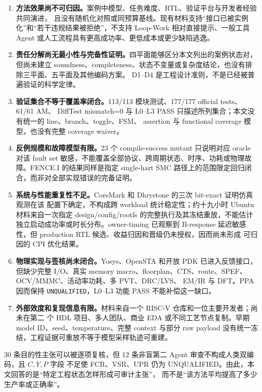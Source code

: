 \documentclass[UTF8,a4paper,zihao=-4,oneside]{ctexart}
\newcommand{\statusword}[1]{\texttt{#1}}
\begin{document}
\begin{enumerate}
  \item \textbf{方法效果尚不可归因。}案例中模型、任务难度、RTL、验证平台与开发者经验共同演进，
  且没有随机化对照或同预算基线。现有材料支持“接口已被实例化”和“若干违规结果被拒绝”，不支持
  Loop-Work 相对直接提示、一般工具 Agent 或人工流程具有更高成功率、更低成本或更少缺陷逃逸。
  \item \textbf{责任分解尚无最小性与完备性证明。}四平面能够区分本文列出的案例状态对，但尚未建立
  soundness、completeness、状态不变量或复杂度结论，也没有排除三平面、五平面及其他编码方案。
  D1--D4 是工程设计准则，不是已经被普遍验证的科学定律。
  \item \textbf{验证集合不等于覆盖率闭合。}113/113 模块测试、177/177 official tests、61/61 AM、
  DiffTest mismatch=0 与 L0--L3 PASS 只描述所列集合；本文没有统一的 line、branch、toggle、FSM、
  assertion 与 functional coverage 模型，也没有完整 coverage waiver。
  \item \textbf{反例规模和故障模型有限。}23 个 compile-success mutant 只说明对应 oracle 对该
  fault set 敏感，不能覆盖全部协议、跨周期状态、时序、功耗或物理故障。FENCE.I 的结果同样是指定
  single-hart SMC 路径上的范围限定回归闭合，而非对全部实现错误的完备证明。
  \item \textbf{系统与性能重复性不足。}CoreMark 和 Dhrystone 的三次 bit-exact 证明仿真观测在该
  配置下确定，不构成跨 workload 统计稳定性；约十九小时 Ubuntu 材料来自一次指定
  design/config/rootfs 的完整执行及其冻结重放，不能估计独立启动成功率或时长分布。owner-timing
  已观察到 B-response 延迟敏感性，但 production RTL 候选、收益归因和晋级仍未授权，因而尚未形成
  可归因的 CPI 优化结果。
  \item \textbf{物理实现与签核尚未闭合。}Yosys、OpenSTA 和开放 PDK 已进入反馈接口，但缺少完整
  I/O、真实 memory macro、floorplan、CTS、route、SPEF、OCV/MMMC、活动率功耗、多 PVT、DRC/LVS、
  EM/IR 与 DFT。PPA 因而保持 \statusword{UNQUALIFIED}，L0--L3 功能 PASS 不能补偿这一缺口。
  \item \textbf{外部效度和复现信息有限。}材料来自一个 RISC-V 仓库和一位主要开发者；尚未在第二
  个 HDL 项目、多人团队、商业 EDA 或不同工艺节点复制。早期 model ID、seed、temperature、完整
  context 与部分 raw payload 没有统一冻结，工程证据可重放不等于模型采样轨迹可重建。
\end{enumerate}

30 条目的性主张可以被逐项复核，但 12 条非盲第二 Agent 审查不构成人类双编码，且 $C,Y,P$ 字段
不足使 FCR、VSR、UPR 仍为 UNQUALIFIED。由此，本文回答的是“特定工程状态怎样形成可审计主张”，
而不是“该方法平均提高了多少生产率或正确率”。
\end{document}
